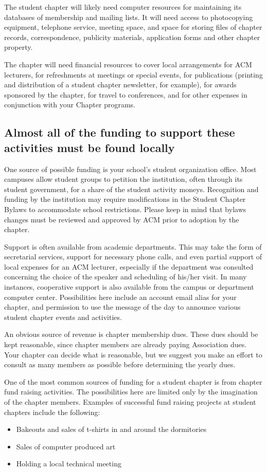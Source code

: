 The student chapter will likely need computer resources for maintaining its databases of membership and mailing lists. It will need access to photocopying equipment, telephone service, meeting space, and space for storing files of chapter records, correspondence, publicity materials, application forms and other chapter property.

The chapter will need financial resources to cover local arrangements for ACM lecturers, for refreshments at meetings or special events, for publications (printing and distribution of a student chapter newsletter, for example), for awards sponsored by the chapter, for travel to conferences, and for other expenses in conjunction with your Chapter programs.

\subsection{Almost all of the funding to support these activities must be found locally}
One source of possible funding is your school's student organization office. Most campuses allow student groups to petition the institution, often through its student government, for a share of the student activity moneys. Recognition and funding by the institution may require modifications in the Student Chapter Bylaws to accommodate school restrictions. Please keep in mind that bylaws changes must be reviewed and approved by ACM prior to adoption by the chapter.

Support is often available from academic departments. This may take the form of secretarial services, support for necessary phone calls, and even partial support of local expenses for an ACM lecturer, especially if the department was consulted concerning the choice of the speaker and scheduling of his/her visit. In many instances, cooperative support is also available from the campus or department computer center. Possibilities here include an account email alias for your chapter, and permission to use the message of the day to announce various student chapter events and activities.

An obvious source of revenue is chapter membership dues. These dues should be kept reasonable, since chapter members are already paying Association dues. Your chapter can decide what is reasonable, but we suggest you make an effort to consult as many members as possible before determining the yearly dues.

One of the most common sources of funding for a student chapter is from chapter fund raising activities. The possibilities here are limited only by the imagination of the chapter members. Examples of successful fund raising projects at student chapters include the following:
	\begin{itemize}
		\item Bakeouts and sales of t-shirts in and around the dormitories
		\item Sales of computer produced art
		\item Holding a local technical meeting
	\end{itemize}

